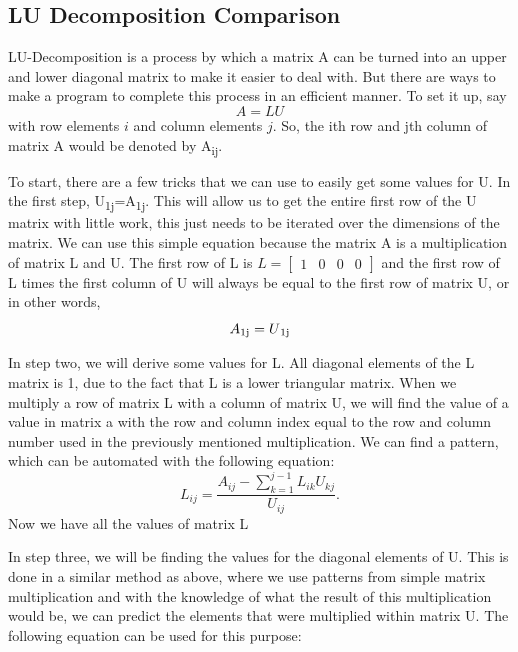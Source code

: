 \documentclass{article}
\begin{document}
\newpage
\subsection{LU Decomposition Comparison}

LU-Decomposition is a process by which a matrix A can be turned into an upper and lower diagonal matrix to make it easier to deal with. But there are ways to make a program to complete this process in an efficient manner. To set it up, say 
\begin{equation*}
A = LU 
\end{equation*}
with row elements $i$ and column elements $j$. So, the ith row and jth column of matrix A would be denoted by A\textsubscript{ij}. 

To start, there are a few tricks that we can use to easily get some values for U. In the first step, U\textsubscript{1j}=A\textsubscript{1j}. This will allow us to get the entire first row of the U matrix with little work, this just needs to be iterated over the dimensions of the matrix. We can use this simple equation because the matrix A is a multiplication of matrix L and U. The first row of L is 
$L=\begin{bmatrix}
1&0&0&0
\end{bmatrix}$
and the first row of L times the first column of U will always be equal to the first row of matrix U, or in other words,
\begin{equation*}
A\textsubscript{1j}=U\textsubscript{1j}
\end{equation*}

In step two, we will derive some values for L. All diagonal elements of the L matrix is 1, due to the fact that L is a lower triangular matrix. When we multiply a row of matrix L with a column of matrix U, we will find the value of a value in matrix a with the row and column index equal to the row and column number used in the previously mentioned multiplication. We can find a pattern, which can be automated with the following equation:    
\begin{equation*}
L_{ij}=\frac{A_{ij} - \sum_{k=1}^{j-1} L_{ik} U_{kj}} {U_{ij}}.
\end{equation*}
Now we have all the values of matrix L

In step three, we will be finding the values for the diagonal elements of U. This is done in a similar method as above, where we use patterns from simple matrix multiplication and with the knowledge of what the result of this multiplication would be, we can predict the elements that were multiplied within matrix U. The following equation can be used for this purpose:
\end{document}
